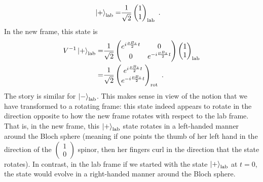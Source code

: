 \documentclass{../lab}
\begin{document}
\begin{enumerate}
\begin{enumerate}
\begin{align*}
	\ket{+}_\text{lab} =&
	\frac{1}{\sqrt{2}}
	\begin{pmatrix}
		1 \\
		1	
	\end{pmatrix}_\text{lab}~.
\end{align*}
In the new frame, this state is 
\begin{align*}
	V^{-1} \ket{+}_\text{lab} =& 
	\frac{1}{\sqrt{2}}
	\begin{pmatrix}
		e^{i \frac{\mu B_z}{2}t} & 0 \\
		0 & e^{-i \frac{\mu B_z}{2}t}
	\end{pmatrix}
	\begin{pmatrix}
		1 \\
		1	
	\end{pmatrix}_\text{lab} \\
	=&
	\frac{1}{\sqrt{2}}
	\begin{pmatrix}
		e^{i \frac{\mu B_z}{2}t} \\
		e^{-i \frac{\mu B_z}{2}t}	
	\end{pmatrix}_\text{rot}~. 
\end{align*}
The story is similar for $\ket{-}_\text{lab}$. This makes sense in view of the notion that we have transformed to a rotating frame: this state indeed appears to rotate in the direction opposite to how the new frame rotates with respect to the lab frame. That is, in the new frame, this $\ket{+}_\text{lab}$ state rotates in a left-handed manner around the Bloch sphere (meaning if one points the thumb of her left hand in the direction of the $\begin{pmatrix} 1 \\ 0 \end{pmatrix}$ spinor, then her fingers curl in the direction that the state rotates). In contrast, in the lab frame if we started with the state $\ket{+}_\text{lab}$ at $t = 0$, the state would evolve in a right-handed manner around the Bloch sphere.  

\vspace{3mm}


\end{enumerate}
\end{enumerate}
\end{document}
